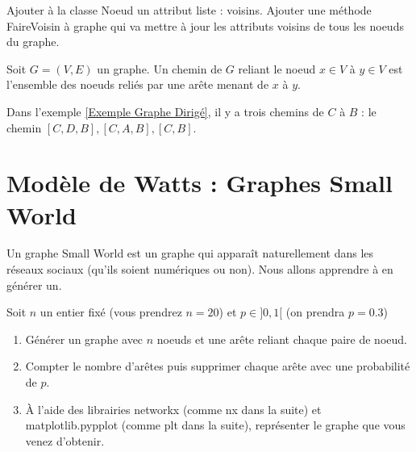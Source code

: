 \documentclass[12pt,fleqn]{article} %
\begin{document}
\begin{exercise}
	Ajouter à la classe Noeud un attribut liste : voisins. Ajouter une méthode FaireVoisin à graphe qui va mettre à jour les attributs voisins de tous les noeuds du graphe.
\end{exercise}

\begin{definition}
	Soit $G = (V,E)$ un graphe. Un chemin de $G$ reliant le noeud $x \in V$ à $y\in V$ est l'ensemble des noeuds reliés par une arête menant de $x$ à $y$. 
\end{definition}

\begin{example}
	Dans l'exemple \ref{Exemple Graphe Dirigé}, il y a trois chemins de $C$ à $B$ : le chemin $[C,D,B], [C,A,B], [C,B]$. 
\end{example}


\section{Modèle de Watts : Graphes Small World}

\begin{remark}
	Un graphe Small World est un graphe qui apparaît naturellement dans les réseaux sociaux (qu'ils soient numériques ou non). Nous allons apprendre à en générer un.
\end{remark}


\begin{exercise}\label{Graphe Small World}
	Soit $n$ un entier fixé (vous prendrez $n = 20$) et $p \in ]0,1[$ (on prendra $p=0.3$)
	\begin{enumerate}
		\item Générer un graphe avec $n$ noeuds et une arête reliant chaque paire de noeud.
		\item Compter le nombre d'arêtes puis supprimer chaque arête avec une probabilité de $p$.
		\item À l'aide des librairies networkx (comme nx dans la suite) et matplotlib.pypplot (comme plt dans la suite), représenter le graphe que vous venez d'obtenir. 
	\end{enumerate}
\end{exercise}
\end{document}
